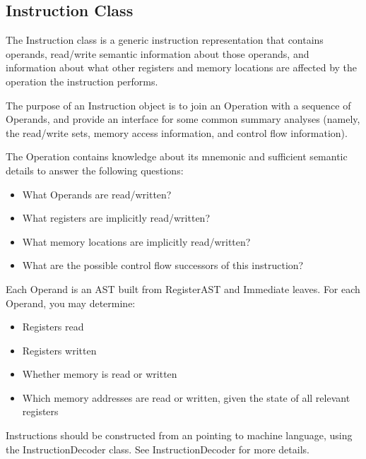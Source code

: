 \subsection{Instruction Class}
\label{sec:instruction}
The Instruction class is a generic instruction representation that contains
operands, read/write semantic information about those operands, and information
about what other registers and memory locations are affected by the operation
the instruction performs.

The purpose of an Instruction object is to join an Operation with a sequence of
Operands, and provide an interface for some common summary analyses (namely, the
read/write sets, memory access information, and control flow information).

The Operation contains knowledge about its mnemonic and sufficient semantic
details to answer the following questions:
\begin{itemize}
\item What Operands are read/written?
\item What registers are implicitly read/written?
\item What memory locations are implicitly read/written?
\item What are the possible control flow successors of this instruction?
\end{itemize}

Each Operand is an AST built from RegisterAST and Immediate leaves. For each Operand, you may determine:
\begin{itemize}
\item Registers read
\item Registers written
\item Whether memory is read or written
\item Which memory addresses are read or written, given the state of all relevant registers
\end{itemize}

Instructions should be constructed from an  
pointing to machine language, using the InstructionDecoder class.  See
InstructionDecoder for more details. 

